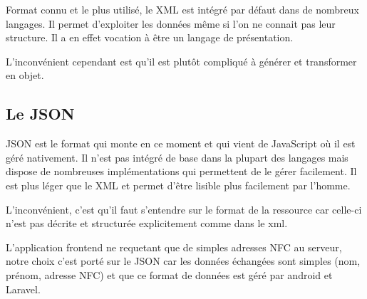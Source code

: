 Format connu et le plus utilisé, le XML est intégré par défaut dans de nombreux
langages. Il permet d'exploiter les données même si l'on ne connait pas leur structure.
Il a en effet vocation à être un langage de présentation.

L'inconvénient cependant est qu'il est plutôt compliqué à générer et transformer
en objet.

\subsection{Le JSON}

JSON est le format qui monte en ce moment et qui vient de JavaScript où il est géré
nativement. Il n'est pas intégré de base dans la plupart des langages mais dispose
de nombreuses implémentations qui permettent de le gérer facilement. Il est plus
léger que le XML et permet d'être lisible plus facilement par l'homme.

L'inconvénient, c'est qu'il faut s'entendre sur le format de la ressource car celle-ci
n'est pas décrite et structurée explicitement comme dans le xml.

L'application frontend ne requetant que de simples adresses NFC au serveur, notre
choix c'est porté sur le JSON car les données échangées sont simples (nom, prénom,
adresse NFC) et que ce format de données est géré par android et Laravel.
